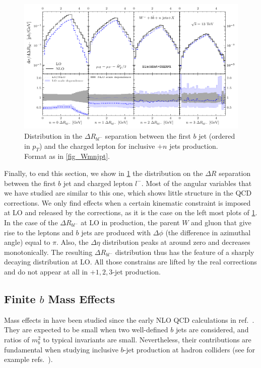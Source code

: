 \begin{figure}[ht]
  \centering
  \includegraphics[clip,scale=1.0]{plots/drbl.pdf}
  \caption{Distribution in the $\Delta R_{bl^-}$ separation between the first
  $b$ jet (ordered in $p_T$) and the charged lepton for inclusive \Wbbm$+n$ jets
  production.  Format as in \cref{fig_Wmnjpt}.}
  \label{fig_Wmnjdrbl}
\end{figure}

Finally, to end this section, we show in \cref{fig_Wmnjdrbl} the distribution
on the $\Delta R$ separation between the first $b$ jet and charged lepton $l^-$. Most
of the angular variables that we have studied are similar to this one, which
shows little structure in the QCD corrections. We only find effects
when a certain kinematic constraint is imposed at LO and released by the corrections,
as it is the case on the left most plots of \cref{fig_Wmnjdrbl}. 
In the case of the $\Delta R_{bl^-}$ at LO in \Wbbm{} production, the parent $W$
and gluon that give rise to the leptons and $b$ jets are produced with $\Delta
\phi$ (the difference in azimuthal angle) equal to $\pi$. Also, the $\Delta \eta$
distribution peaks at around zero and decreases monotonically. The resulting $\Delta R_{bl^-}$ distribution thus has the feature of a sharply decaying
distribution at LO. All
those constrains are lifted by the real corrections and do not appear at all in
\Wbb$+1,2,3$-jet production.


\subsection{Finite $b$ Mass Effects}
\label{sec:bmass}
Mass effects in \Wbb{} have been studied since the early NLO QCD
calculations in ref.~\cite{FebresCordero:2006sj}. They are expected to be small when two
well-defined $b$ jets are considered, and ratios of $m_b^2$ to typical invariants
are small. Nevertheless, their contributions are fundamental when studying
inclusive $b$-jet production at hadron colliders (see for example 
refs.~\cite{Campbell:2008hh,Caola:2011pz}).


